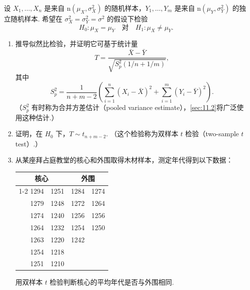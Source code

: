\begin{exercise}\label{exercise:8.41}
设 $X_1,\ldots,X_n$ 是来自 $\mathrm n(\mu_X,\sigma_X^2)$ 的随机样本，$Y_1,\ldots,Y_m$ 是来自 $\mathrm n(\mu_Y,\sigma_Y^2)$ 的独立随机样本. 希望在 $\sigma_X^2=\sigma_Y^2=\sigma^2$ 的假设下检验
$$H_0:\mu_X=\mu_Y\quad\text{对}\quad H_1:\mu_X\ne\mu_Y.$$
\begin{enumerate}
\item 推导似然比检验，并证明它可基于统计量
$$T=\frac{\bar X-\bar Y}{\sqrt{S_p^2(1/n+1/m)}},$$
其中
$$S_p^2=\frac1{n+m-2}\left(\sum_{i=1}^n(X_i-\bar X)^2+\sum_{i=1}^m(Y_i-\bar Y)^2\right).$$
（$S_p^2$ 有时称为合并方差估计（pooled variance estimate），\autoref{sec:11.2}将广泛使用这种估计.）
\item 证明，在 $H_0$ 下，$T\sim t_{n+m-2}$. （这个检验称为双样本 $t$ 检验（two-sample $t$ test\mbox{）.}）
\item 从某座拜占庭教堂的核心和外围取得木材样本，测定年代得到以下数据：
\begin{center}\begin{tabular}{rr@{\qquad}rr}\toprule
\multicolumn{2}{c}{核心}&\multicolumn{2}{c}{外围}\\\cmidrule{1-2}\cmidrule{3-4}
1294&1251&1284&1274\\
1279&1248&1272&1264\\
1274&1240&1256&1256\\
1264&1232&1254&1250\\
1263&1220&1242&\\
1254&1218&&\\
1251&1210&&\\\bottomrule
\end{tabular}\end{center}
用双样本 $t$ 检验判断核心的平均年代是否与外围相同.
\end{enumerate}
\end{exercise}
